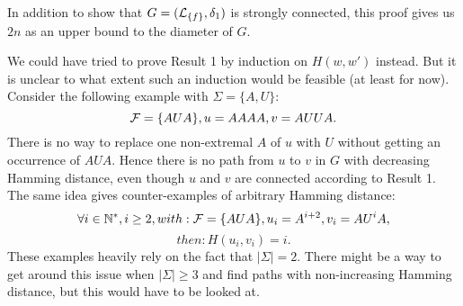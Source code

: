 \documentclass{article}
\begin{document}
In addition to show that $G = (\mathcal{L}_{\{f\}}, \delta_1)$ is strongly connected, this proof gives us $2n$ as an upper bound to the diameter of $G$.

We could have tried to prove Result 1 by induction on $H(w,w')$ instead. But it is unclear to what extent such an induction would be feasible (at least for now). Consider the following example with $\Sigma = \{A,U\}:$
$$ \mathcal{F} = \{AUA\}, u=AAAA, v=AUUA.$$
There is no way to replace one non-extremal $A$ of $u$ with $U$ without getting an occurrence of $AUA$. Hence there is no path from $u$ to $v$ in $G$ with decreasing Hamming distance, even though $u$ and $v$ are connected according to Result 1. The same idea gives counter-examples of arbitrary Hamming distance:
$$\forall i \in \mathbb{N}^*, i \geq 2, with: \mathcal{F} = \{AUA\}, u_i=A^{i+2}, v_i=A U^i A,$$
$$then: H(u_i,v_i) = i.$$
These examples heavily rely on the fact that $|\Sigma|=2$. There might be a way to get around this issue when $|\Sigma| \geq 3$ and find paths with non-increasing Hamming distance, but this would have to be looked at.
\end{document}

